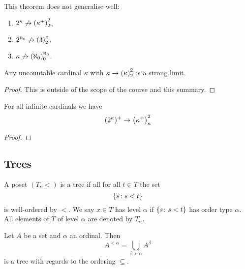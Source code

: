 This theorem does not generalise well:
\begin{enumerate}
    \item \(2^{\kappa}\not\to\left(\kappa^{+}\right)_{2}^{2}\),
    \item \(2^{\aleph_{0}}\not\to\left(3\right)_{2}^{\kappa}\),
    \item \(\kappa\not\to\left(\aleph_{0}\right)_{0}^{\aleph_{0}}\).
\end{enumerate}

\begin{proposition}
    Any uncountable cardinal \(\kappa\) with \(\kappa\to\left(\kappa\right)_{2}^{2}\)
    is a strong limit.

    \begin{proof}
        This is outside of the scope of the course and this summary.
    \end{proof}
\end{proposition}

\begin{theorem}
    For all infinite cardinals we have
    \[
        (2^{\kappa})^{+}\to\left(\kappa^{+}\right)_{\kappa}^{2}
    \]

    \begin{proof}
    \end{proof}
\end{theorem}

\subsection{Trees}

\begin{definition}
    A poset \((T,<)\) is a tree if all for all \(t\in T\) the set
    \[
        \left\{s\colon s<t\right\}
    \]
    is well-ordered by \(<\). We say \(x\in T\) has level \(\alpha\) if
    \(\left\{s\colon s<t\right\}\) has order type \(\alpha\). All elements of \(T\) of
    level \(\alpha\) are denoted by \(T_{\alpha}\).
\end{definition}

\begin{definition}
    Let \(A\) be a set and \(\alpha\) an ordinal. Then
    \[
        A^{<\alpha}=\bigcup_{\beta<\alpha}A^{\beta}
    \]
    is a tree with regards to the ordering \(\subseteq\).
\end{definition}

